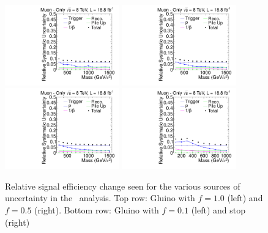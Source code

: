 \begin{figure}[ht]
\centering
  \includegraphics[clip=true, trim=0.0cm 0cm 2.8cm 0cm, width=0.44\textwidth]{figures/muonly/MoGluino_f100Uncertainty}
  \includegraphics[clip=true, trim=0.0cm 0cm 2.8cm 0cm, width=0.44\textwidth]{figures/muonly/MoGluino_f50Uncertainty} \\
  \includegraphics[clip=true, trim=0.0cm 0cm 2.8cm 0cm, width=0.44\textwidth]{figures/muonly/MoGluino_f10Uncertainty}
  \includegraphics[clip=true, trim=0.0cm 0cm 2.8cm 0cm, width=0.44\textwidth]{figures/muonly/MoStopUncertainty}
\caption[Relative signal efficiency change seen for the various sources of uncertainty in the \muononly\ analysis]
{Relative signal efficiency change seen for the various sources of uncertainty in the \muononly\ analysis.
Top row: Gluino with $f=1.0$ (left) and $f=0.5$ (right).
Bottom row: Gluino with $f=0.1$ (left) and stop (right)}
    \label{fig:MuOnlyUncSource}
\end{figure}

